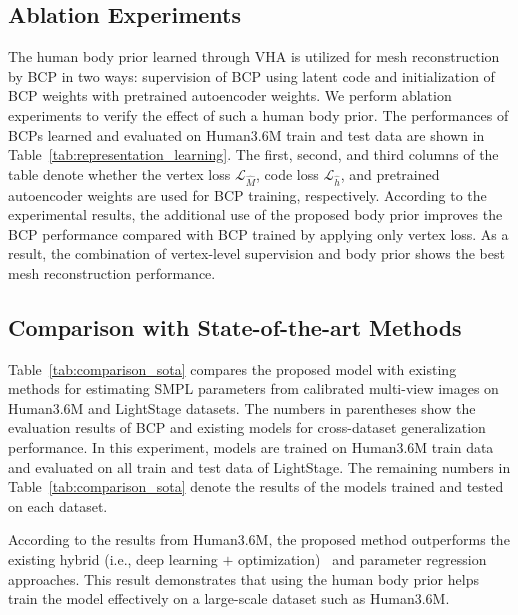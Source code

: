 \documentclass{article}
\begin{document}
\subsection{Ablation Experiments}
\label{ssec:ablation_experiments}

The human body prior learned through VHA is utilized for mesh reconstruction by BCP in two ways: supervision of BCP using latent code and initialization of BCP weights with pretrained autoencoder weights. We perform ablation experiments to verify the effect of such a human body prior. The performances of BCPs learned and evaluated on Human3.6M train and test data are shown in Table~\ref{tab:representation_learning}. The first, second, and third columns of the table denote whether the vertex loss $\mathcal{L}_{\hat{M}}$, code loss $\mathcal{L}_{\hat{h}}$, and pretrained autoencoder weights are used for BCP training, respectively. According to the experimental results, the additional use of the proposed body prior improves the BCP performance compared with BCP trained by applying only vertex loss. As a result, the combination of vertex-level supervision and body prior shows the best mesh reconstruction performance.













\subsection{Comparison with State-of-the-art Methods}
\label{ssec:comparison_sota}

Table~\ref{tab:comparison_sota} compares the proposed model with existing methods for estimating SMPL parameters from calibrated multi-view images on Human3.6M and LightStage datasets. The numbers in parentheses show the evaluation results of BCP and existing models for cross-dataset generalization performance. In this experiment, models are trained on Human3.6M train data and evaluated on all train and test data of LightStage. The remaining numbers in Table~\ref{tab:comparison_sota} denote the results of the models trained and tested on each dataset.

According to the results from Human3.6M, the proposed method outperforms the existing hybrid (i.e., deep learning $+$ optimization)~\cite{Chun_2023_WACV, 2019_LT, lightcap2021} and parameter regression~\cite{2020_Shin} approaches. This result demonstrates that using the human body prior helps train the model effectively on a large-scale dataset such as Human3.6M.
\end{document}
